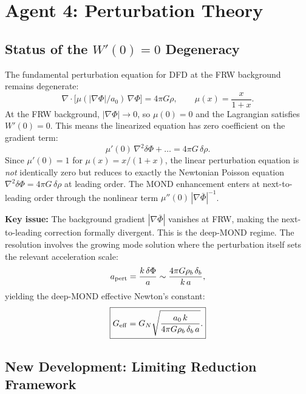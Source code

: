 \documentclass[11pt]{article}
\newcommand{\Geff}{G_{\rm eff}}
\newcommand{\aM}{a_0}
\begin{document}
\section{Agent 4: Perturbation Theory}

\subsection{Status of the $W'(0) = 0$ Degeneracy}

The fundamental perturbation equation for DFD at the FRW background
remains degenerate:
\begin{equation}
  \nabla \cdot \bigl[\mu(|\nabla\Phi|/\aM)\,\nabla\Phi\bigr] = 4\pi G\rho,
  \qquad \mu(x) = \frac{x}{1+x}.
\end{equation}
At the FRW background, $|\nabla\Phi| \to 0$, so $\mu(0) = 0$ and
the Lagrangian satisfies $W'(0) = 0$. This means the linearized
equation has zero coefficient on the gradient term:
\begin{equation}
  \mu'(0)\,\nabla^2\delta\Phi + \ldots = 4\pi G\,\delta\rho.
\end{equation}
Since $\mu'(0) = 1$ for $\mu(x) = x/(1+x)$, the linear perturbation
equation is \emph{not} identically zero but reduces to exactly the
Newtonian Poisson equation $\nabla^2\delta\Phi = 4\pi G\,\delta\rho$
at leading order. The MOND enhancement enters at next-to-leading order
through the nonlinear term $\mu''(0)\,|\nabla\bar{\Phi}|^{-1}$.

\textbf{Key issue:} The background gradient $|\nabla\bar{\Phi}|$ vanishes
at FRW, making the next-to-leading correction formally divergent. This is
the deep-MOND regime. The resolution involves the growing mode solution
where the perturbation itself sets the relevant acceleration scale:
\begin{equation}
  a_{\rm pert} = \frac{k\,\delta\Phi}{a} \sim \frac{4\pi G\rho_b\,\delta_b}{k\,a},
\end{equation}
yielding the deep-MOND effective Newton's constant:
\begin{equation}
  \boxed{\Geff = G_N \sqrt{\frac{\aM\,k}{4\pi G\rho_b\,\delta_b\,a}}.}
\end{equation}

\subsection{New Development: Limiting Reduction Framework}
\end{document}
